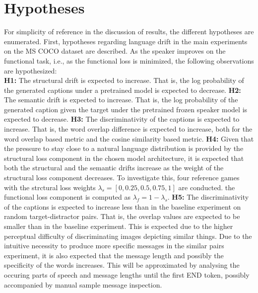 \section{Hypotheses}

For simplicity of reference in the discussion of results, the different hypotheses are enumerated.
First, hypotheses regarding language drift in the main experiments on the MS COCO dataset are described. As the speaker improves on the functional task, i.e., as the functional loss is minimized, the following observations are hypothesized: \\
\newline 
\textbf{H1:} The structural drift is expected to increase. That is, the log probability of the generated captions under a pretrained model is expected to decrease. \newline
\textbf{H2:} The semantic drift is expected to increase. That is, the log probability of the generated caption given the target under the pretrained frozen speaker model is expected to decrease. \newline
\textbf{H3:} The discriminativity of the captions is expected to increase. That is, the word overlap difference is expected to increase, both for the word overlap based metric and the cosine similarity based metric. \newline
\textbf{H4:} Given that the pressure to stay close to a natural language distribution is provided by the structural loss component in the chosen model architecture, it is expected that both the structural and the semantic drifts increase as the weight of the structural loss component decreases. To investigate this, four reference games with the strctural loss weights $\lambda_s = [0, 0.25, 0.5, 0.75, 1]$ are conducted. the functional loss component is computed as $\lambda_f = 1 - \lambda_s$. \newline
\textbf{H5:} The discriminativity of the captions is expected to increase less than in the baseline experiment on random target-distractor pairs. That is, the overlap values are expected to be smaller than in the baseline experiment. This is expected due to the higher perceptual difficulty of discriminating images depicting similar things. Due to the intuitive necessity to produce more specific messages in the similar pairs experiment, it is also expected that the message length and possibly the specificity of the words increases. This will be approximated by analysing the occuring parts of speech and message lengths until the first END token, possibly accompanied by manual sample message inspection.\newline
